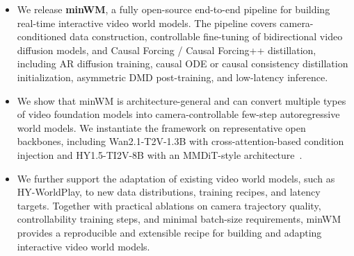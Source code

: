\begin{itemize}
    \item We release \textbf{minWM}, a fully open-source end-to-end pipeline for building real-time interactive video world models. The pipeline covers camera-conditioned data construction, controllable fine-tuning of bidirectional video diffusion models, and Causal Forcing / Causal Forcing++ distillation, including AR diffusion training, causal ODE or causal consistency distillation initialization, asymmetric DMD post-training, and low-latency inference. 

    \item We show that minWM is architecture-general and can convert multiple types of video foundation models into camera-controllable few-step autoregressive world models. We instantiate the framework on representative open backbones, including Wan2.1-T2V-1.3B with cross-attention-based condition injection and HY1.5-TI2V-8B with an MMDiT-style architecture~\cite{esser2024scaling}.

    \item We further support the adaptation of existing video world models, such as HY-WorldPlay, to new data distributions, training recipes, and latency targets. Together with practical ablations on camera trajectory quality, controllability training steps, and minimal batch-size requirements, minWM provides a reproducible and extensible recipe for building and adapting interactive video world models.
\end{itemize}